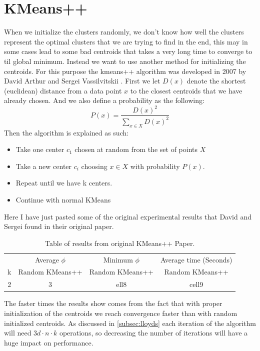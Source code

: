 \documentclass[12pt]{report}
\begin{document}
\section{KMeans++}
\label{sec:plusplus}
When we initialize the clusters randomly, we don't know how well the clusters represent the optimal clusters that we are trying to find in the end, this may in some cases lead to some  bad centroids that takes a very long time to converge to til global minimum. Instead we want to use another method for initializing the centroids. For this purpose the kmeans++ algorithm was developed in 2007 by David Arthur and Sergei Vassilvitskii \cite{plusplus}.
First we let $D(x)$ denote the shortest (euclidean) distance from a data point $x$ to the closest centroids that we have already chosen. And we also define a probability as the following:
\begin{equation}
P(x) = \frac{D(x)^2}{\sum_{x\in X}D(x)^2}
\end{equation}
Then the algorithm is explained as such:
\begin{itemize}
  \item Take one center $c_1$ chosen at random from the set of points $X$
  \item Take a new center $c_i$ choosing $x\in X$ with probability $P(x)$.
  \item Repeat until we have k centers.
  \item Continue with normal KMeans
\end{itemize}

Here I have just pasted some of the original experimental results that David and Sergei found in their original paper.

\begin{table}[h!]
  \centering
    \begin{tabular}{|c| c |c| c| }
      & Average $\phi$ & Minimum $\phi$ & Average time (Seconds) \\
      k & Random KMeans++ & Random KMeans++ & Random KMeans++ \\
      \hline
      2&3&  ell8 & cell9
    \end{tabular}
    \caption{Table of results from original KMeans++ Paper.}
    \label{table:kpp}
\end{table}

The faster times the results show comes from the fact that with proper initialization of the centroids we reach convergence faster than with random initialized centroids. As discussed in \ref{subsec:lloyds} each iteration of the algorithm will need $3d \cdot n\cdot k$ operations, so decreasing the number of iterations will have a huge impact on performance.
\end{document}
